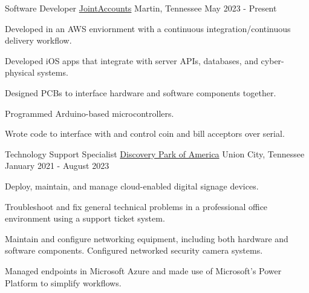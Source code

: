 
\begin{cventries}


  \cventry
    {Software Developer}
    {\href{https://www.jointaccounts.com}{JointAccounts}}
    {Martin, Tennessee}
    {May 2023 - Present}
    {
		\begin{cvitems}
      		\item Developed in an AWS enviornment with a continuous integration/continuous delivery workflow.
      		\item Developed iOS apps that integrate with server APIs, databases, and cyber-physical systems.
      		\item Designed PCBs to interface hardware and software components together.
      		\item Programmed Arduino-based microcontrollers.
      		\item Wrote code to interface with and control coin and bill acceptors over serial.
		\end{cvitems}
   	}


  \cventry
    {Technology Support Specialist}
    {\href{https://discoveryparkofamerica.com/}{Discovery Park of America}}
    {Union City, Tennessee}
    {January 2021 - August 2023}
    {
      \begin{cvitems}
        \item Deploy, maintain, and manage cloud-enabled digital signage devices.
        \item Troubleshoot and fix general technical problems in a professional office environment using a support ticket system.
        \item Maintain and configure networking equipment, including both hardware and software components. Configured networked security camera systems.
        \item Managed endpoints in Microsoft Azure and made use of Microsoft's Power Platform to simplify workflows.
      \end{cvitems}
    }

\end{cventries}
